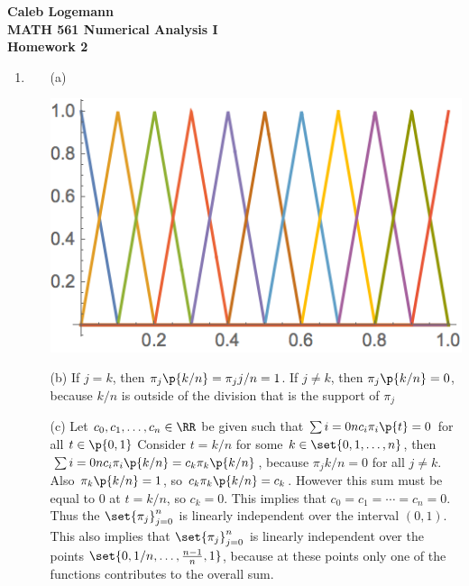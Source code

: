 \documentclass[11pt]{article}
\begin{document}
\noindent \textbf{\Large{Caleb Logemann \\
MATH 561 Numerical Analysis I \\
Homework 2
}}

\begin{enumerate}
    \item
        \begin{enumerate}
            \item[(a)] \hfill \\
                \begin{center}
                    \includegraphics[scale=.5]{Figures/02_1a.png}
                \end{center}

            \item[(b)]
                If $j = k$, then $\pi_j\p{k/n} = \pi_j{j/n} = 1$.
                If $j \neq k$, then $\pi_j\p{k/n} = 0$, because $k/n$ is
                outside of the division that is the support of $\pi_j$

            \item[(c)]
                Let $c_0, c_1, \ldots, c_n \in \RR$ be given such that
                $\sum{i=0}{n}{c_i \pi_i\p{t}} = 0$ for all $t \in \p{0,1}$
                Consider $t = k/n$ for some $k \in \set{0, 1, \ldots, n}$, then
                $\sum{i=0}{n}{c_i \pi_i\p{k/n}} = c_k \pi_k\p{k/n}$, because
                $\pi_j{k/n} = 0$ for all $j \neq k$.
                Also $\pi_k\p{k/n} = 1$, so $c_k \pi_k\p{k/n} = c_k$.
                However this sum must be equal to $0$ at $t = k/n$, so $c_k = 0$.
                This implies that $c_0 = c_1 = \cdots = c_n = 0$.
                Thus the $\set{\pi_j}_{j=0}^n$ is linearly independent over the
                interval $(0, 1)$.
                This also implies that $\set{\pi_j}_{j=0}^n$ is linearly independent 
                over the points $\set{0, 1/n, \ldots, \frac{n-1}{n}, 1}$, because
                at these points only one of the functions contributes to the
                overall sum.


\end{enumerate}
\end{enumerate}
\end{document}
